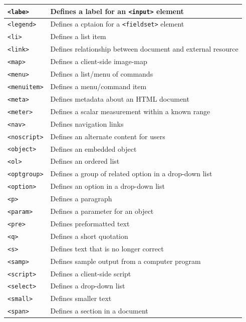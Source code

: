 \documentclass[11pt, letterpaper]{article}
\begin{document}
\begin{longtable}{l l}
			\texttt{<labe>} & Defines a label for an \texttt{<input>} element\\\midrule
			\texttt{<legend>} & Defines a cptaion for a \texttt{<fieldset>} element\\\midrule
			\texttt{<li>} & Defines a list item\\\midrule
			\texttt{<link>} & Defines relationship between document and external resource\\\midrule
			\texttt{<map>} & Defines a client-side image-map\\\midrule
			\texttt{<menu>} & Defines a list/menu of commands\\\midrule
			\texttt{<menuitem>} & Defines a menu/command item\\\midrule
			\texttt{<meta>} & Defines metadata about an HTML document\\\midrule
			\texttt{<meter>} & Defines a scalar measurement within a known range\\\midrule
			\texttt{<nav>} & Defines navigation links\\\midrule
			\texttt{<noscript>} & Defines an alternate content for users\\\midrule
			\texttt{<object>} & Defines an embedded object\\\midrule
			\texttt{<ol>} & Defines an ordered list\\\midrule
			\texttt{<optgroup>} & Defines a group of related option in a drop-down list\\\midrule
			\texttt{<option>} & Defines an option in a drop-down list\\\midrule
			\texttt{<p>} & Defines a paragraph\\\midrule
			\texttt{<param>} & Defines a parameter for an object\\\midrule
			\texttt{<pre>} & Defines preformatted text\\\midrule
			\texttt{<q>} & Defines a short quotation\\\midrule
			\texttt{<s>} & Defines text that is no longer correct\\\midrule
			\texttt{<samp>} & Defines sample output from a computer program\\\midrule
			\texttt{<script>} & Defines a client-side script\\\midrule
			\texttt{<select>} & Defines a drop-down list\\\midrule
			\texttt{<small>} & Defines smaller text\\\midrule
			\texttt{<span>} & Defines a section in a document\\\midrule

\end{longtable}
\end{document}
